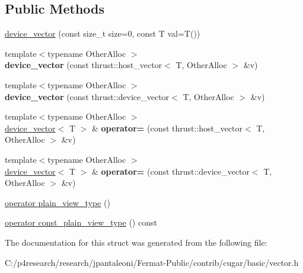 \subsection*{Public Methods}
\begin{DoxyCompactItemize}
\item 
\hyperlink{group___basic_ga9a8d64513864f07fe5e576a13980fafe}{device\+\_\+vector} (const size\+\_\+t size=0, const T val=T())
\item 
{\footnotesize template$<$typename Other\+Alloc $>$ }\\{\bfseries device\+\_\+vector} (const thrust\+::host\+\_\+vector$<$ T, Other\+Alloc $>$ \&v)
\item 
{\footnotesize template$<$typename Other\+Alloc $>$ }\\{\bfseries device\+\_\+vector} (const thrust\+::device\+\_\+vector$<$ T, Other\+Alloc $>$ \&v)
\item 
{\footnotesize template$<$typename Other\+Alloc $>$ }\\\hyperlink{structcugar_1_1device__vector}{device\+\_\+vector}$<$ T $>$ \& {\bfseries operator=} (const thrust\+::host\+\_\+vector$<$ T, Other\+Alloc $>$ \&v)
\item 
{\footnotesize template$<$typename Other\+Alloc $>$ }\\\hyperlink{structcugar_1_1device__vector}{device\+\_\+vector}$<$ T $>$ \& {\bfseries operator=} (const thrust\+::device\+\_\+vector$<$ T, Other\+Alloc $>$ \&v)
\item 
\hyperlink{group___basic_gaf23abbba65db2e117920090f0f97ed72}{operator plain\+\_\+view\+\_\+type} ()
\item 
\hyperlink{group___basic_ga86ea65d4863bb5e1ed5da63e6355672f}{operator const\+\_\+plain\+\_\+view\+\_\+type} () const
\end{DoxyCompactItemize}


The documentation for this struct was generated from the following file\+:\begin{DoxyCompactItemize}
\item 
C\+:/p4research/research/jpantaleoni/\+Fermat-\/\+Public/contrib/cugar/basic/vector.\+h\end{DoxyCompactItemize}
